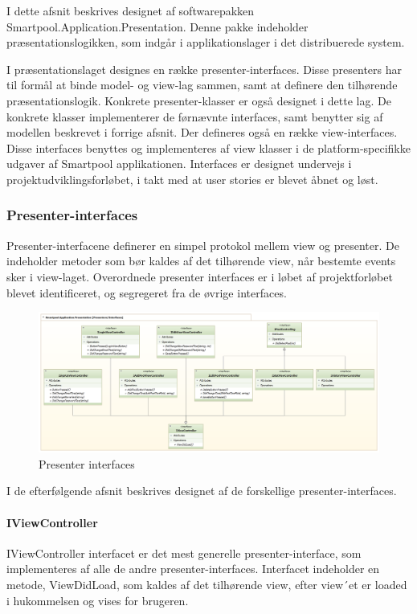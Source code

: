 I dette afsnit beskrives designet af softwarepakken Smartpool.Application.Presentation. Denne pakke indeholder præsentationslogikken, som indgår i applikationslager i det distribuerede system.

I præsentationslaget designes en række presenter-interfaces. Disse presenters har til formål at binde model- og view-lag sammen, samt at definere den tilhørende præsentationslogik. Konkrete presenter-klasser er også designet i dette lag. De konkrete klasser implementerer de førnævnte interfaces, samt benytter sig af modellen beskrevet i forrige afsnit. Der defineres også en række view-interfaces. Disse interfaces benyttes og implementeres af view klasser i de platform-specifikke udgaver af Smartpool applikationen. Interfaces er designet undervejs i projektudviklingsforløbet, i takt med at user stories er blevet åbnet og løst.

\subsubsection{Presenter-interfaces}
Presenter-interfacene definerer en simpel protokol mellem view og presenter. De indeholder metoder som bør kaldes af det tilhørende view, når bestemte events sker i view-laget. Overordnede presenter interfaces er i løbet af projektforløbet blevet identificeret, og segregeret fra de øvrige interfaces.

\begin{figure}
	\centering
	\includegraphics[width=1.0\linewidth]{figs/design/application_presentation_interfaces}
	\caption{Presenter interfaces}
	\label{fig:application_presentation_interfaces}
\end{figure}

I de efterfølgende afsnit beskrives designet af de forskellige presenter-interfaces.

\paragraph{IViewController}
IViewController interfacet er det mest generelle presenter-interface, som implementeres af alle de andre presenter-interfaces. Interfacet indeholder en metode, ViewDidLoad, som kaldes af det tilhørende view, efter view´et er loaded i hukommelsen og vises for brugeren.

